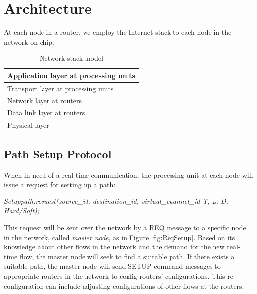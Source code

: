 \documentclass[10pt]{article}
\begin{document}
\section{Architecture}
At each node in a router, we employ the Internet stack to each node in the 
network on chip.
\begin{table}[h]
\begin{center}
  \begin{tabular}{ | l | }
    \hline
    Application layer at processing units \\ \hline
    Transport layer at processing units \\ \hline
    Network layer at routers \\ \hline
	Data link layer at routers \\ \hline
	Physical layer \\
    \hline
  \end{tabular}
\end{center}
\caption{Network stack model}
\label{table:NetworkStack}
\end{table}

\subsection{Path Setup Protocol}
When in need of a real-time communication, the processing unit at each node 
will issue a request for setting up a path:

{\em Setuppath.request(source\_id, destination\_id, virtual\_channel\_id T, L,
D, Hard/Soft);}

This request will be sent over the network by a REQ message to a specific node
in the network, called {\em master node}, as in Figure \ref{fig:ReqSetup}.
Based on its knowledge about other flows in the network and the demand for the
new real-time flow, the master node will seek to find a suitable path. If there
exists a suitable path, the master node will send SETUP command messages to
appropriate routers in the network to config routers' configurations. This re-configuration
can include adjusting configurations of other flows at the routers.
\end{document}
